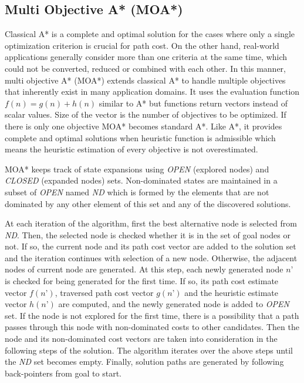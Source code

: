 \documentclass[10pt,journal]{IEEEtran}
\begin{document}
\subsection{Multi Objective A* (MOA*)}

Classical A* \cite{AStarHart:1968} is a complete and optimal solution for the cases where only a single optimization criterion is crucial for path cost. On the other hand, real-world applications generally consider more than one criteria at the same time, which could not be converted, reduced or combined with each other. In this manner, multi objective A* (MOA*) \cite{MOAStewart:1991} extends classical A* to handle multiple objectives that inherently exist in many application domains. It uses the evaluation function $f(n) = g(n) + h(n)$ similar to A* but functions return vectors instead of scalar values. Size of the vector is the number of objectives to be optimized. If there is only one objective MOA* becomes standard A*. Like A*, it provides complete and optimal solutions when heuristic function is admissible which means the heuristic estimation of every objective is not overestimated.

MOA* keeps track of state expansions using {\it OPEN} (explored nodes) and {\it CLOSED} (expanded nodes) sets. Non-dominated states are maintained in a subset of {\it OPEN} named {\it ND} which is formed by the elements that are not dominated by any other element of this set and any of the discovered solutions.

At each iteration of the algorithm, first the best alternative node is selected from {\it ND}. Then, the selected node is checked whether it is in the set of goal nodes or not. If so, the current node and its path cost vector are added to the solution set and the iteration continues with selection of a new node. Otherwise, the adjacent nodes of current node are generated. At this step, each newly generated node $n’$ is checked for being generated for the first time. If so, its path cost estimate vector $f(n’)$, traversed path cost vector $g(n’)$ and the heuristic estimate vector $h(n’)$ are computed, and the newly generated node is added to {\it OPEN} set. If the node is not explored for the first time, there is a possibility that a path passes through this node with non-dominated costs to other candidates. Then the node and its non-dominated cost vectors are taken into consideration in the following steps of the solution. The algorithm iterates over the above steps until the {\it ND} set becomes empty. Finally, solution paths are generated by following back-pointers from goal to start. 
\end{document}

